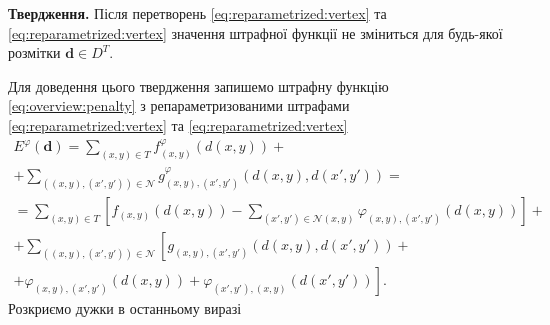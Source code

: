 \textbf{Твердження.}
Після перетворень \eqref{eq:reparametrized:vertex} та \eqref{eq:reparametrized:vertex}
значення штрафної функції не зміниться для будь-якої розмітки $\pmb{d} \in D^T$.

Для доведення цього твердження запишемо штрафну функцію
\eqref{eq:overview:penalty} з репараметризованими штрафами
\eqref{eq:reparametrized:vertex} та \eqref{eq:reparametrized:vertex}
\begin{equation*}
\begin{gathered}
    E^{\varphi} \left( \pmb{d} \right)
    = \sum \limits_{\left(x, y \right) \in T}
        f_{\left(x, y \right)}^{\varphi} \left(
            d \left(x, y \right)
        \right) + \\
    + \sum \limits_{\left(\left(x, y \right), \left(x', y'\right) \right) \in \mathcal{N}}
        g_{\left(x, y \right), \left(x', y' \right)}^{\varphi} \left(
            d \left( x, y \right), d \left( x', y' \right)
        \right) = \\
    = \sum \limits_{\left(x, y \right) \in T} \left[
        f_{\left(x, y \right)} \left( d \left(x, y \right) \right)
        - \sum \limits_{\left(x', y' \right) \in \mathcal{N} \left(x, y \right)}
            \varphi_{\left(x, y \right), \left(x', y' \right)} \left(
                d \left(x, y \right)
            \right)
        \right] + \\
        + \sum \limits_{\left(\left(x, y \right), \left(x', y'\right) \right) \in \mathcal{N}}
            \left[
                g_{\left(x, y \right), \left(x', y' \right)} \left(
                    d \left(x, y \right), d \left(x', y' \right)
                \right) + \right. \\
                \left.
                + \varphi_{\left(x, y \right), \left(x', y' \right)}
                    \left( d \left(x, y \right)
                \right)
                + \varphi_{\left(x', y' \right), \left(x, y \right)}
                    \left( d \left(x', y' \right)
                \right)
            \right].
\end{gathered}
\end{equation*}
Розкриємо дужки в останньому виразі
